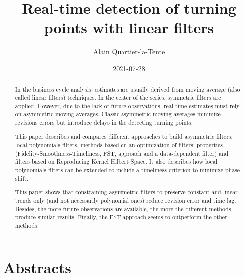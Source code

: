 \documentclass[
  12pt,
  ,
  a4paper]{article}
\title{Real-time detection of turning points with linear filters}
\author{Alain Quartier-la-Tente}
\date{2021-07-28}
\newcommand\1{\mathds{1}}
\begin{document}
\maketitle

{
\hypersetup{linkcolor=}
\setcounter{tocdepth}{3}
\tableofcontents
}
\newpage

\hypertarget{abstracts}{%
\section*{Abstracts}\label{abstracts}}

\begin{abstract}
In the business cycle analysis, estimates are usually derived from moving average (also called linear filters) techniques.
In the center of the series, symmetric filters are applied.
However, due to the lack of future observations, real-time estimates must rely on asymmetric moving averages.
Classic asymmetric moving averages minimize revisions errors but introduce delays in the detecting turning points.

This paper describes and compares different approaches to build asymmetric filters: local polynomials filters, methods based on an optimization of filters' properties (Fidelity-Smoothness-Timeliness, FST, approach and a data-dependent filter) and filters based on Reproducing Kernel Hilbert Space.
It also describes how local polynomials filters can be extended to include a timeliness criterion to minimize phase shift.

This paper shows that constraining asymmetric filters to preserve constant and linear trends only (and not necessarily polynomial ones) reduce revision error and time lag.
Besides, the more future observations are available, the more the different methods produce similar results.
Finally, the FST approach seems to outperform the other methods.

\end{abstract}

\renewcommand{\abstractname}{Résumé}
\end{document}
